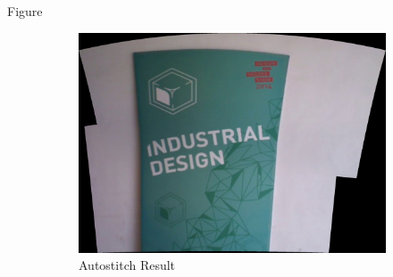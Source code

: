 Figure \

\begin{figure}
\begin{subfigure}[b]{0.3\textwidth}
\includegraphics[width=\linewidth]{figures/idc_indoor/autostitch.jpg}
\caption{Autostitch Result}
\end{subfigure}
\begin{subfigure}[b]{0.3\textwidth}

\end{subfigure}
\end{figure}
